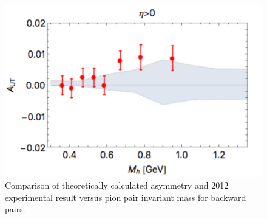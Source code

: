 \documentclass[letterpaper, abstract = on,listof=totoc, bibliography=totoc]{scrreprt}
\begin{document}
\begin{figure}
\begin{center}
\includegraphics[width = .6\textwidth]{A_Mh_eta-pos}
\caption[Comparison of theoretically calculated asymmetry and 2012 experimental result versus pion pair invariant mass for backward pairs]{Comparison of theoretically calculated asymmetry and 2012 experimental result versus pion pair invariant mass for backward pairs.}
\label{fig:A_Mh_eta-pos_calc}
\end{center}
\end{figure}
\end{document}
